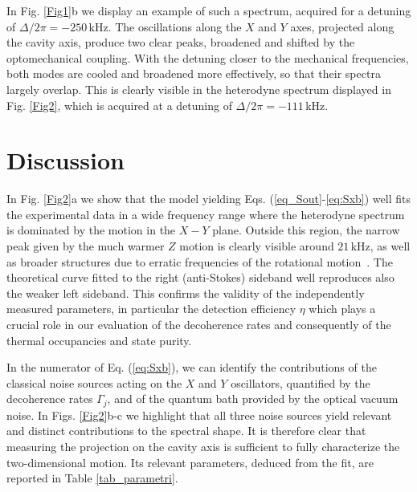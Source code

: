 \documentclass[11pt,floatfix,amssymb,prx,aps,longbibliography,superscriptaddress,nopacs]{revtex4-2}
\newcommand{\OmegaX}{\Omega_{\scriptstyle{x}}}
\newcommand{\OmegaY}{\Omega_{\scriptstyle{y}}}
\newcommand{\GY}{\Gamma_{\scriptstyle{y}}}
\newcommand{\GX}{\Gamma_{\scriptstyle{x}}}
\newcommand{\gX}{g_{\scriptstyle{x}}}
\newcommand{\gY}{g_{\scriptstyle{y}}}
\begin{document}
In Fig. \ref{Fig1}b we display an example of such a spectrum, acquired for a detuning of $\Delta/2\pi = -250\,$kHz. The oscillations along the $X$ and $Y$ axes, projected along the cavity axis, produce two clear peaks, broadened and shifted by the optomechanical coupling.
With the detuning closer to the mechanical frequencies, both modes are cooled and broadened more effectively, so that their spectra largely overlap. This is clearly visible in the heterodyne spectrum displayed in Fig. \ref{Fig2}, which is acquired at a detuning of $\Delta/2\pi = -111\,$kHz. 

\section*{Discussion}

In Fig. \ref{Fig2}a we show that the model yielding Eqs. (\ref{eq_Sout}-\ref{eq:Sxb}) well fits the experimental data in a wide frequency range where the heterodyne spectrum is dominated by the motion in the $X-Y$ plane. Outside this region, the narrow peak given by the much warmer $Z$ motion is clearly visible around $21\,$kHz, as well as broader structures due to erratic frequencies of the rotational motion~\cite{Barker2023,Ulbricht2018}. The theoretical curve fitted to the right (anti-Stokes) sideband well reproduces also the weaker left sideband. This confirms the validity of the independently measured parameters, in particular the detection efficiency $\eta$ which plays a crucial role in our evaluation of the decoherence rates and consequently of the thermal occupancies and state purity.   

In the numerator of Eq. (\ref{eq:Sxb}), we can identify the contributions of the classical noise sources acting on the $X$ and $Y$ oscillators, quantified by the decoherence rates $\Gamma_j$, and of the quantum bath provided by
the optical vacuum noise. In Figs. \ref{Fig2}b-c we highlight that all three noise sources yield relevant and distinct contributions to the spectral shape. It is therefore clear that measuring the projection on the cavity axis is sufficient to fully characterize the two-dimensional motion. Its relevant parameters, deduced from the fit, are reported in Table \ref{tab_parametri}. 

\end{document}
